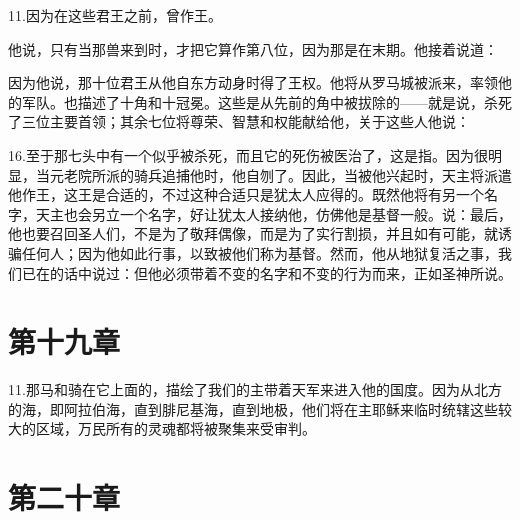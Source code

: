 11.因为在这些君王之前，曾作王。\par

他说，只有当那兽来到时，才把它算作第八位，因为那是在末期。他接着说道：\par

因为他说，那十位君王从他自东方动身时得了王权。他将从罗马城被派来，率领他的军队。也描述了十角和十冠冕。这些是从先前的角中被拔除的——就是说，杀死了三位主要首领；其余七位将尊荣、智慧和权能献给他，关于这些人他说：\par

16.至于那七头中有一个似乎被杀死，而且它的死伤被医治了，这是指。因为很明显，当元老院所派的骑兵追捕他时，他自刎了。因此，当被他兴起时，天主将派遣他作王，这王是合适的，不过这种合适只是犹太人应得的。既然他将有另一个名字，天主也会另立一个名字，好让犹太人接纳他，仿佛他是基督一般。说：最后，他也要召回圣人们，不是为了敬拜偶像，而是为了实行割损，并且如有可能，就诱骗任何人；因为他如此行事，以致被他们称为基督。然而，他从地狱复活之事，我们已在的话中说过：但他必须带着不变的名字和不变的行为而来，正如圣神所说。\par


\section{第十九章}

11.那马和骑在它上面的，描绘了我们的主带着天军来进入他的国度。因为从北方的海，即阿拉伯海，直到腓尼基海，直到地极，他们将在主耶稣来临时统辖这些较大的区域，万民所有的灵魂都将被聚集来受审判。\par


\section{第二十章}

